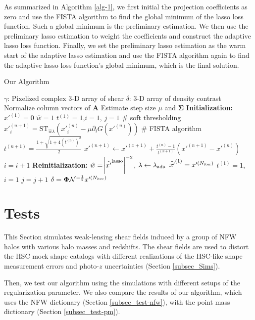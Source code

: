 \documentclass[twocolumn]{aastex62}
\begin{document}
As summarized in Algorithm \ref{alg-1}, we first initial the projection
coefficients as zero and use the FISTA algorithm to find the global minimum of
the lasso loss function. Such a global minimum is the preliminary estimation.
We then use the preliminary lasso estimation to weight the coefficients and
construct the adaptive lasso loss function. Finally, we set the preliminary
lasso estimation as the warm start of the adaptive lasso estimation and use the
FISTA algorithm again to find the adaptive lasso loss function's global minimum,
which is the final solution.


\begin{algorithm}[H]
\renewcommand{\thealgorithm}{}
\label{alg-1}
\caption{Our Algorithm}
\begin{algorithmic}[1]
\INPUT $\gamma$: Pixelized complex $3$-D array of shear
\OUTPUT  $\delta$: $3$-D array of density contrast
\STATE Normalize column vectors of $\mathbf{A}$
\STATE Estimate step size $\mu$ and $\mathbf{\Sigma}$
\STATE \textbf{Initialization:}
\STATE $x'^{(1)} = 0$
\STATE $\hat{w}=1$
\STATE $t^{(1)}=1$,$i=1$, $j=1$
        \STATE \# soft thresholding
        \STATE $x'^{(n+1)}_{i}=\mathrm{ST}_{\hat{w}\lambda} \left(x'^{(n)}_{i} -\mu \partial_i G(x'^{(n)})\right)$
        \STATE \# FISTA algorithm
        \STATE $t^{(n+1)}=\frac{1+\sqrt{1+4(t^{(n)})^2}}{2}$
        \STATE $x'^{(n+1)} \leftarrow x'^{(x+1)}+ \frac{t^{(n)}-1}{t^{(n+1)}}(x'^{(n+1)}-x'^{(n)})$
        \STATE $i=i+1$
    \ENDWHILE
\STATE \textbf{Reinitialization:}
\STATE $\hat{w}=\abs{\hat{x'}^{\rm{lasso}}}^{-2}$, $\lambda \leftarrow
\lambda_{\rm{ada}}$
\STATE $\hat{x'}^{(1)} = x'^{(N_{\rm{iter}})}$
\STATE $t^{(1)}=1$, $i=1$
\STATE $j=j+1$
\ENDWHILE
\STATE $\delta=\mathbf{\Phi}\mathcal{N}^{-\frac{1}{2}}x'^{(N_{\rm{iter}})}$
\end{algorithmic}
\end{algorithm}


\section{Tests}
\label{sec_Test}

This Section simulates weak-lensing shear fields induced by a group of NFW
halos with various halo masses and redshifts. The shear fields are used to
distort the HSC mock shape catalogs with different realizations of the HSC-like
shape measurement errors and photo-$z$ uncertainties (Section \ref{subsec_Sims}).

Then, we test our algorithm using the simulations with different setups of the
regularization parameter. We also compare the results of our algorithm, which
uses the NFW dictionary (Section \ref{subsec_test-nfw}), with the point mass
dictionary (Section \ref{subsec_test-pm}).
\end{document}
